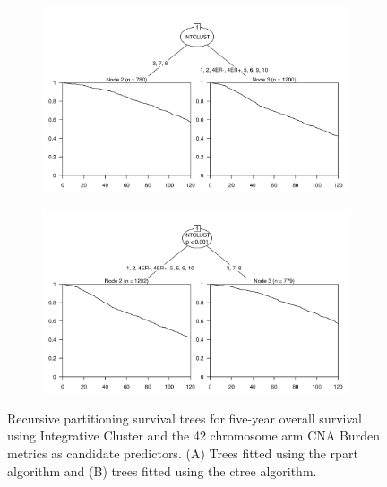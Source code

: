 \begin{figure}[!htb]
\centering

\vspace{0.5cm}

\begin{subfigure}{\textwidth}
\subcaption{}
\includegraphics[width=1\textwidth]{../figures/Appendices/Appendix_B/PA_PartyKit_Survival_Burden_TenYearOS_INTCLUST.png}
\end{subfigure}

\vspace{2cm}

\begin{subfigure}{\textwidth}
\subcaption{}
\includegraphics[width=1\textwidth]{../figures/Appendices/Appendix_B/PA_Ctree_Survival_Burden_TenYearOS_INTCLUST.png}
\end{subfigure}

\vspace{0.5cm}

\caption[Recursive partitioning survival trees for five-year overall survival using Integrative Cluster and the 42 chromosome arm CNA Burden metrics as candidate predictors.]{Recursive partitioning survival trees for five-year overall survival using  Integrative Cluster and the 42 chromosome arm CNA Burden metrics as candidate predictors. (A) Trees fitted using the rpart algorithm and (B) trees fitted using the ctree algorithm.}
\end{figure}


